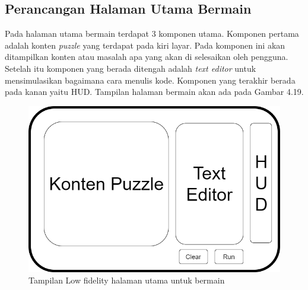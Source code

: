 	\subsection{Perancangan Halaman Utama Bermain}
	Pada halaman utama bermain terdapat 3 komponen utama. Komponen pertama adalah konten \textit{puzzle} yang terdapat pada kiri layar. Pada komponen ini akan ditampilkan konten atau masalah apa yang akan di selesaikan oleh pengguna. Setelah itu komponen yang berada ditengah adalah \textit{text editor} untuk mensimulasikan bagaimana cara menulis kode. Komponen yang terakhir berada pada kanan yaitu HUD. Tampilan halaman bermain akan ada pada Gambar 4.19.
	\begin{figure}
		\centering
		\includegraphics[width=\linewidth-80pt]{pics/low/low3}
		\caption{Tampilan Low fidelity halaman utama untuk bermain}
	\end{figure}
	
